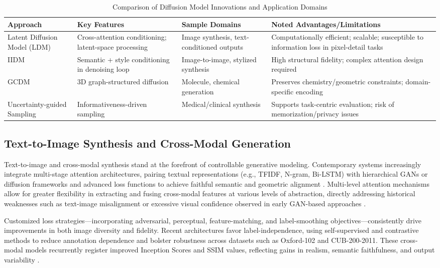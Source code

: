\begin{table*}[htbp]
\centering
\caption{Comparison of Diffusion Model Innovations and Application Domains}
\label{tab:diffusion_summary}
\begin{adjustbox}{max width=\textwidth}
\begin{tabular}{llll}
\toprule
\textbf{Approach} & \textbf{Key Features} & \textbf{Sample Domains} & \textbf{Noted Advantages/Limitations} \\
\midrule
Latent Diffusion Model (LDM) & Cross-attention conditioning; latent-space processing & Image synthesis, text-conditioned outputs & Computationally efficient; scalable; susceptible to information loss in pixel-detail tasks \\
IIDM & Semantic + style conditioning in denoising loop & Image-to-image, stylized synthesis & High structural fidelity; complex attention design required \\
GCDM & 3D graph-structured diffusion & Molecule, chemical generation & Preserves chemistry/geometric constraints; domain-specific encoding \\
Uncertainty-guided Sampling & Informativeness-driven sampling & Medical/clinical synthesis & Supports task-centric evaluation; risk of memorization/privacy issues \\
\bottomrule
\end{tabular}
\end{adjustbox}
\end{table*}

\subsection{Text-to-Image Synthesis and Cross-Modal Generation}

Text-to-image and cross-modal synthesis stand at the forefront of controllable generative modeling. Contemporary systems increasingly integrate multi-stage attention architectures, pairing textual representations (e.g., TFIDF, N-gram, Bi-LSTM) with hierarchical GANs or diffusion frameworks and advanced loss functions to achieve faithful semantic and geometric alignment \cite{ref94,ref96}. Multi-level attention mechanisms allow for greater flexibility in extracting and fusing cross-modal features at various levels of abstraction, directly addressing historical weaknesses such as text-image misalignment or excessive visual confidence observed in early GAN-based approaches \cite{ref96}.

Customized loss strategies—incorporating adversarial, perceptual, feature-matching, and label-smoothing objectives—consistently drive improvements in both image diversity and fidelity. Recent architectures favor label-independence, using self-supervised and contrastive methods to reduce annotation dependence and bolster robustness across datasets such as Oxford-102 and CUB-200-2011. These cross-modal models recurrently register improved Inception Scores and SSIM values, reflecting gains in realism, semantic faithfulness, and output variability \cite{ref94,ref96,ref101}.

